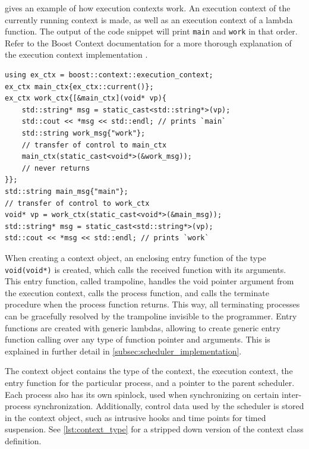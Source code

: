  gives an example of how execution contexts work. An execution context of the currently running context is made, as well as an execution context of a lambda function. The output of the code snippet will print \texttt{main} and \texttt{work} in that order. Refer to the Boost Context documentation for a more thorough explanation of the execution context implementation \citep{kowalke2017boost}.

\begin{lstfloat}
\begin{lstlisting}[caption={Transfer of control between execution contexts.}, label={lst:transfer_control_execution_contexts}, style={CustomC++}, xleftmargin={2em}]
using ex_ctx = boost::context::execution_context;
ex_ctx main_ctx{ex_ctx::current()};
ex_ctx work_ctx{[&main_ctx](void* vp){
    std::string* msg = static_cast<std::string*>(vp);
    std::cout << *msg << std::endl; // prints `main`
    std::string work_msg{"work"};
    // transfer of control to main_ctx
    main_ctx(static_cast<void*>(&work_msg));
    // never returns
}};
std::string main_msg{"main"};
// transfer of control to work_ctx
void* vp = work_ctx(static_cast<void*>(&main_msg));
std::string* msg = static_cast<std::string*>(vp);
std::cout << *msg << std::endl; // prints `work`
\end{lstlisting}
\end{lstfloat}

When creating a context object, an enclosing entry function of the type \lstinline[style={CustomC++}]|void(void*)| is created, which calls the received function with its arguments. This entry function, called trampoline, handles the void pointer argument from the execution context, calls the process function, and calls the terminate procedure when the process function returns. This way, all terminating processes can be gracefully resolved by the trampoline invisible to the programmer. Entry functions are created with generic lambdas, allowing to create generic entry function calling over any type of function pointer and arguments. This is explained in further detail in \cref{subsec:scheduler_implementation}.

The context object contains the type of the context, the execution context, the entry function for the particular process, and a pointer to the parent scheduler. Each process also has its own spinlock, used when synchronizing on certain inter\hyp{}process synchronization. Additionally, control data used by the scheduler is stored in the context object, such as intrusive hooks and time points for timed suspension. See \cref{lst:context_type} for a stripped down version of the context class definition.

